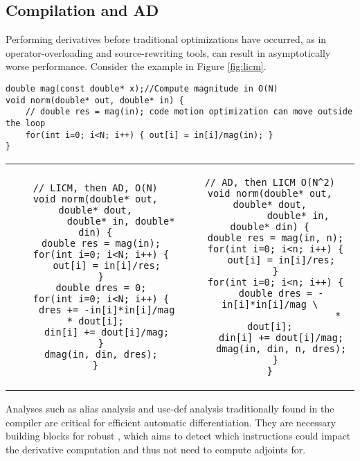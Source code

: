 \subsection{Compilation and AD}
Performing derivatives before traditional optimizations have occurred, as in operator-overloading and source-rewriting tools, can result in asymptotically worse performance. Consider the example in Figure \ref{fig:licm}.

\begin{figure*}
    \centering
\begin{verbatim}
double mag(const double* x);//Compute magnitude in O(N)
void norm(double* out, double* in) {
    // double res = mag(in); code motion optimization can move outside the loop
    for(int i=0; i<N; i++) { out[i] = in[i]/mag(in); }
}
\end{verbatim}
\begin{tabular}{c|c}
\begin{minipage}[T]{0.49\linewidth}
\begin{verbatim}
// LICM, then AD, O(N)
void norm(double* out, double* dout,
         double* in, double* din) {
  double res = mag(in);
  for(int i=0; i<N; i++) {
    out[i] = in[i]/res;
  }
  double dres = 0;
  for(int i=0; i<N; i++) {
    dres += -in[i]*in[i]/mag * dout[i];
    din[i] += dout[i]/mag;
  }
  dmag(in, din, dres);
}
\end{verbatim}
\end{minipage}& \begin{minipage}[T]{0.49\linewidth}
\begin{verbatim}
// AD, then LICM O(N^2)
void norm(double* out, double* dout,
          double* in, double* din) {
  double res = mag(in, n);
  for(int i=0; i<n; i++) {
    out[i] = in[i]/res;
  }
  for(int i=0; i<n; i++) {
    double dres = -in[i]*in[i]/mag \
                        * dout[i];
    din[i] += dout[i]/mag;
    dmag(in, din, n, dres);
  }
}
\end{verbatim}
\end{minipage}
\end{tabular}
    \caption{In the second program, mag is still able to be moved outside as it is the same every iteration, however, dmag cannot be moved outside the loop as it reads/writes to the same memory.
}
    \label{fig:licm}
\end{figure*}

Analyses such as alias analysis and use-def analysis traditionally found in the compiler are critical for efficient automatic differentiation. They are necessary building blocks for robust , which aims to detect which instructions could impact the derivative computation and thus not need to compute adjoints for.





